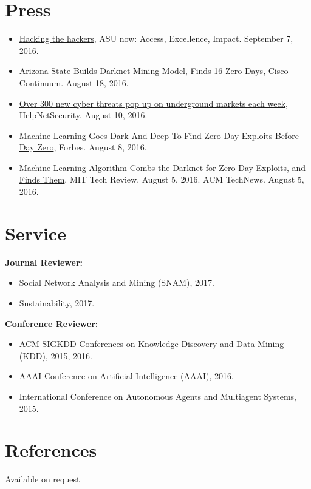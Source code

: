 \documentclass[margin,line]{CV}
\begin{document}
\begin{resume}
\section{\sc Press}
\begin{itemize}[leftmargin=*]
\item \href{https://asunow.asu.edu/20160907-solutions-asu-researchers-hacking-hackers-new-approach}{Hacking the hackers}, ASU now: Access, Excellence, Impact. September 7, 2016.

\item \href{https://continuum.cisco.com/2016/08/18/arizona-state-builds-darknet-mining-model-finds-16-zero-days/}{Arizona State Builds Darknet Mining Model, Finds 16 Zero Days}, Cisco Continuum. August 18, 2016.

\item \href{https://www.helpnetsecurity.com/2016/08/10/cyber-threats-underground-markets/}{Over 300 new cyber threats pop up on underground markets each week}, HelpNetSecurity. August 10, 2016.

\item \href{http://www.forbes.com/sites/kevinmurnane/2016/08/08/machine-learning-goes-dark-and-deep-to-find-zero-day-exploits-before-day-zero/#49b6e2706d76}{ Machine Learning Goes Dark And Deep To Find Zero-Day Exploits Before Day Zero}, Forbes. August 8, 2016.

\item \href{https://www.technologyreview.com/s/602115/machine-learning-algorithm-combs-the-darknet-for-zero-day-exploits-and-finds-them/}{ Machine-Learning Algorithm Combs the Darknet for Zero Day Exploits, and Finds Them},
MIT Tech Review. August 5, 2016. ACM TechNews. August 5, 2016.

\end{itemize}

\section{\sc Service}
{\bf Journal Reviewer:}
\begin{itemize}
	\item Social Network Analysis and Mining (SNAM), 2017.
	\item Sustainability, 2017. 
\end{itemize}

{\bf Conference Reviewer:}
\begin{itemize}
\item ACM SIGKDD Conferences on Knowledge Discovery and Data Mining (KDD), 2015, 2016.
\item AAAI Conference on Artificial Intelligence (AAAI), 2016.
\item International Conference on Autonomous Agents and Multiagent Systems, 2015. 
\end{itemize}


\section{\sc References} Available on request

\end{resume}
\end{document}
